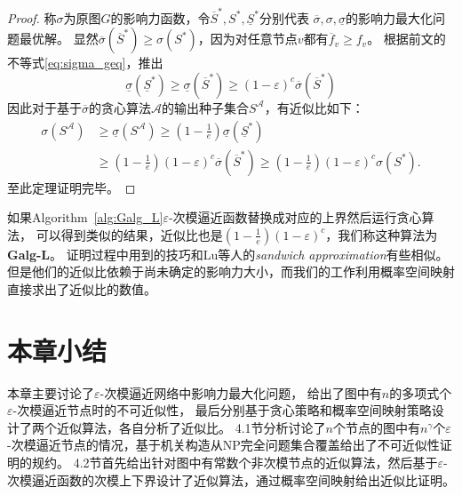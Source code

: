 \begin{proof}
称$\sigma$为原图$G$的影响力函数，令$\overline{S}^*,S^*,\underline{S}^*$分别代表
$\overline{\sigma}, \sigma, \underline{\sigma}$的影响力最大化问题最优解。
显然$\overline{\sigma}(\overline{S}^*) \geq \sigma(S^*)$，因为对任意节点$v$都有$\overline{f}_v \geq f_v$。
根据前文的不等式\ref{eq:sigma_geq}，推出
$$\underline{\sigma}(\underline{S}^*)
\geq \underline{\sigma}(\overline{S}^*)
\geq (1-\varepsilon)^c \overline{\sigma}(\overline{S}^*)$$
因此对于基于$\overline{\sigma}$的贪心算法$\mathcal{A}$的输出种子集合$S^{\mathcal{A}}$，有近似比如下：
\begin{equation*}
\begin{array}{ll}
\sigma(S^{\mathcal{A}})
&\geq \underline{\sigma}(S^{\mathcal{A}})
\geq (1-\frac{1}{e})\underline{\sigma}(\underline{S}^*)\\
&\geq (1-\frac{1}{e})(1-\varepsilon)^c \overline{\sigma}(\overline{S}^*)
\geq (1-\frac{1}{e})(1-\varepsilon)^c \sigma(S^*).
\end{array}
\end{equation*}
至此定理证明完毕。
\end{proof}

如果Algorithm~\ref{alg:Galg_L}$\varepsilon$-次模逼近函数替换成对应的上界然后运行贪心算法，
可以得到类似的结果，近似比也是$(1-\frac{1}{e})(1-\varepsilon)^c$，我们称这种算法为\textbf{Galg-L}。
证明过程中用到的技巧和Lu等人\cite{lu2015competition}的{\em sandwich approximation}有些相似。
但是他们的近似比依赖于尚未确定的影响力大小，而我们的工作利用概率空间映射直接求出了近似比的数值。


\section{本章小结}
本章主要讨论了$\varepsilon$-次模逼近网络中影响力最大化问题，
给出了图中有$n$的多项式个$\varepsilon$-次模逼近节点时的不可近似性，
最后分别基于贪心策略和概率空间映射策略设计了两个近似算法，各自分析了近似比。
4.1节分析讨论了$n$个节点的图中有$n^{\gamma}$个$\varepsilon$-次模逼近节点的情况，基于机关构造从NP完全问题集合覆盖给出了不可近似性证明的规约。
4.2节首先给出针对图中有常数个非次模节点的近似算法，然后基于$\varepsilon$-次模逼近函数的次模上下界设计了近似算法，通过概率空间映射给出近似比证明。







